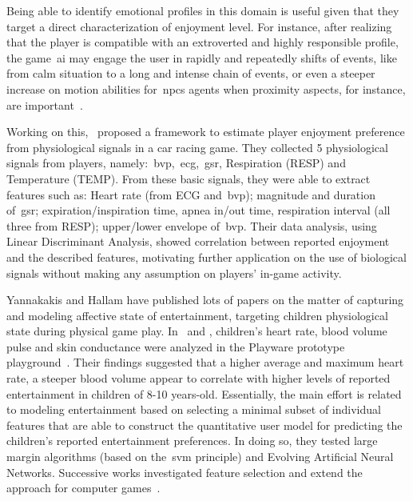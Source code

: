 Being able to identify emotional profiles in this domain is useful given that they target a direct characterization of enjoyment level. For instance, after realizing that the player is compatible with an extroverted and highly responsible profile, the game~\gls{ai} may engage the user in rapidly and repeatedly shifts of events, like from calm situation to a long and intense chain of events, or even a steeper increase on motion abilities for~\gls{npc}s agents when proximity aspects, for instance, are important~\citep{bakkes_player_2012}.

Working on this,~\cite{tognetti_modeling_2010} proposed a framework to estimate player enjoyment preference from physiological signals in a car racing game. They collected 5 physiological signals from players, namely:~\gls{bvp},~\gls{ecg},~\gls{gsr}, Respiration (RESP) and Temperature (TEMP). From these basic signals, they were able to extract features such as: Heart rate (from ECG and~\gls{bvp}); magnitude and duration of~\gls{gsr}; expiration/inspiration time, apnea in/out time, respiration interval (all three from RESP); upper/lower envelope of~\gls{bvp}. Their data analysis, using Linear Discriminant Analysis, showed correlation between reported enjoyment and the described features, motivating further application on the use of biological signals without making any assumption on players' in-game activity.

Yannakakis and Hallam have published lots of papers on the matter of capturing and modeling affective state of entertainment, targeting children physiological state during physical game play. In~\cite{yannakakis_modeling_2006} and \cite{yannakakis_entertainment_2008}, children's heart rate, blood volume pulse and skin conductance were analyzed in the Playware prototype playground~\citep{lund_playware_2005}. Their findings suggested that a higher average and maximum heart rate, a steeper blood volume appear to correlate with higher levels of reported entertainment in children of 8-10 years-old. Essentially, the main effort is related to modeling entertainment based on selecting a minimal subset of individual features that are able to construct the quantitative user model for predicting the children's reported entertainment preferences. In doing so, they tested large margin algorithms (based on the~\gls{svm} principle) and Evolving Artificial Neural Networks. Successive works investigated feature selection and extend the approach for computer games~\citep{yannakakis_towards_2006,yannakakis_entertainment_2007,yannakakis_feature_2007,yannakakis_entertainment_2008-1}. 

